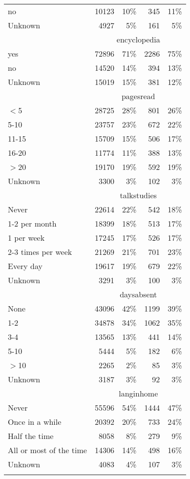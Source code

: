 \begin{longtable}{lrrrr}
  no & 10123 & 10\% & 345 & 11\% \\ 
  Unknown & 4927 & 5\% & 161 & 5\% \\ 
   \hline & \multicolumn{4}{c}{encyclopedia} \\ \cline{2-5} yes & 72896 & 71\% & 2286 & 75\% \\ 
  no & 14520 & 14\% & 394 & 13\% \\ 
  Unknown & 15019 & 15\% & 381 & 12\% \\ 
   \hline & \multicolumn{4}{c}{pagesread} \\ \cline{2-5} $<$5 & 28725 & 28\% & 801 & 26\% \\ 
  5-10 & 23757 & 23\% & 672 & 22\% \\ 
  11-15 & 15709 & 15\% & 506 & 17\% \\ 
  16-20 & 11774 & 11\% & 388 & 13\% \\ 
  $>$20 & 19170 & 19\% & 592 & 19\% \\ 
  Unknown & 3300 & 3\% & 102 & 3\% \\ 
   \hline & \multicolumn{4}{c}{talkstudies} \\ \cline{2-5} Never & 22614 & 22\% & 542 & 18\% \\ 
  1-2 per month & 18399 & 18\% & 513 & 17\% \\ 
  1 per week & 17245 & 17\% & 526 & 17\% \\ 
  2-3 times per week & 21269 & 21\% & 701 & 23\% \\ 
  Every day & 19617 & 19\% & 679 & 22\% \\ 
  Unknown & 3291 & 3\% & 100 & 3\% \\ 
   \hline & \multicolumn{4}{c}{daysabsent} \\ \cline{2-5} None & 43096 & 42\% & 1199 & 39\% \\ 
  1-2 & 34878 & 34\% & 1062 & 35\% \\ 
  3-4 & 13565 & 13\% & 441 & 14\% \\ 
  5-10 & 5444 & 5\% & 182 & 6\% \\ 
  $>$10 & 2265 & 2\% &  85 & 3\% \\ 
  Unknown & 3187 & 3\% &  92 & 3\% \\ 
   \hline & \multicolumn{4}{c}{langinhome} \\ \cline{2-5} Never & 55596 & 54\% & 1444 & 47\% \\ 
  Once in a while & 20392 & 20\% & 733 & 24\% \\ 
  Half the time & 8058 & 8\% & 279 & 9\% \\ 
  All or most of the time & 14306 & 14\% & 498 & 16\% \\ 
  Unknown & 4083 & 4\% & 107 & 3\% \\ 
  \hline
\label{g8readingstudent}
\end{longtable}
